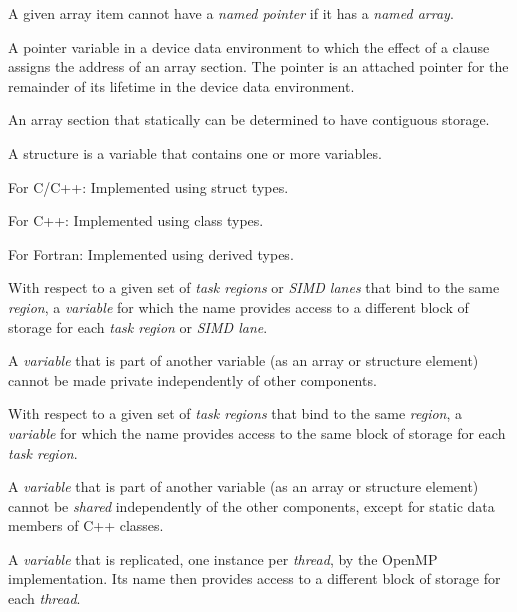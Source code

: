 \begin{adjustwidth}{-0.75in}{0in}
\begin{note}
A given array item cannot have a \emph{named pointer} if it has a \emph{named array}.
\end{note}
\end{adjustwidth}
\glossarydefend


\glossarydefstart
A pointer variable in a device data environment to which the effect of a  clause 
assigns the address of
an array section.  The pointer is
an attached pointer for the remainder of its lifetime in the device data environment.
\glossarydefend
\bigskip

\glossarydefstart
An array section that statically can be determined to have contiguous storage.
\glossarydefend
\bigskip

\glossarydefstart
A structure is a variable that contains one or more variables. 

For C/C++: 
\nopagebreak
Implemented using struct types.

For C++: 
\nopagebreak
Implemented using class types.        

For Fortran: 
\nopagebreak
Implemented using derived types.        
\glossarydefend

\glossarydefstart
With respect to a given set of \emph{task regions} or \emph{SIMD lanes} that bind to the same
 \emph{region}, a \emph{variable} for which the name provides access to a different block of 
storage for each \emph{task region} or \emph{SIMD lane}.

A \emph{variable} that is part of another variable (as an array or structure element) cannot 
be made private independently of other components.
\glossarydefend

\glossarydefstart
With respect to a given set of \emph{task regions} that bind to the same  
\emph{region}, a \emph{variable} for which the name provides access to the same block of storage for 
each \emph{task region}.

A \emph{variable} that is part of another variable (as an array or structure element) cannot 
be \emph{shared} independently of the other components, except for static data members 
of C++ classes.
\glossarydefend

\glossarydefstart
A \emph{variable} that is replicated, one instance per \emph{thread}, by the OpenMP 
implementation. Its name then provides access to a different block of storage for 
each \emph{thread}.

